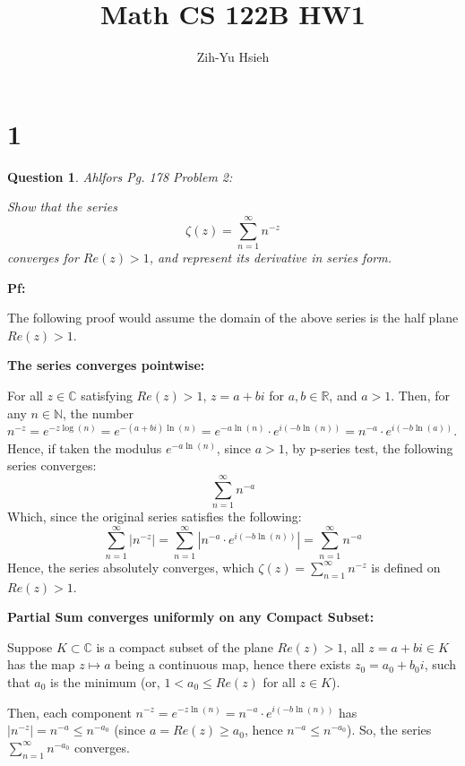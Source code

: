 \documentclass{article}
\title{Math CS 122B HW1}
\author{Zih-Yu Hsieh}
\newtheorem{question}{Question}
\begin{document}
\maketitle

\section*{1}
\begin{myBox}[]{}
    \begin{question}
        Ahlfors Pg. 178 Problem 2:

        Show that the series
        $$\zeta(z)=\sum_{n=1}^{\infty}n^{-z}$$
        converges for $Re(z)>1$, and represent its derivative in series form.
    \end{question}
\end{myBox}

\textbf{Pf:}

The following proof would assume the domain of the above series is the half plane $Re(z)>1$.

\hfil

\textbf{The series converges pointwise:}

For all $z\in\mathbb{C}$ satisfying $Re(z)>1$, $z=a+bi$ for $a,b\in\mathbb{R}$, and $a>1$. Then, for any $n\in\mathbb{N}$,
the number $n^{-z}=e^{-z\log(n)} = e^{-(a+bi)\ln(n)} = e^{-a\ln(n)}\cdot e^{i(-b\ln(n))} = n^{-a}\cdot e^{i(-b\ln(a))}$. Hence, if taken the modulus $e^{-a\ln(n)}$,
since $a>1$, by p-series test, the following series converges:
$$\sum_{n=1}^{\infty}n^{-a}$$
Which, since the original series satisfies the following:
$$\sum_{n=1}^{\infty}|n^{-z}| = \sum_{n=1}^{\infty}\left|n^{-a}\cdot e^{i(-b\ln(n))}\right| = \sum_{n=1}^{\infty}n^{-a}$$
Hence, the series absolutely converges, which $\zeta(z)=\sum_{n=1}^{\infty}n^{-z}$ is defined on $Re(z)>1$.

\hfil

\textbf{Partial Sum converges uniformly on any Compact Subset:}

Suppose $K\subset \mathbb{C}$ is a compact subset of the plane $Re(z)>1$, all $z=a+bi\in K$ has the map $z\mapsto a$ being a continuous map, hence there exists $z_0=a_0+b_0i$, such that $a_0$ is the minimum (or, $1<a_0\leq Re(z)$ for all $z\in K$).

Then, each component $n^{-z}=e^{-z\ln(n)}=n^{-a}\cdot e^{i(-b\ln(n))}$ has $|n^{-z}| = n^{-a}\leq n^{-a_0}$ (since $a=Re(z)\geq a_0$, hence $n^{-a}\leq n^{-a_0}$).
So, the series $\sum_{n=1}^{\infty}n^{-a_0}$ converges.
\end{document}
